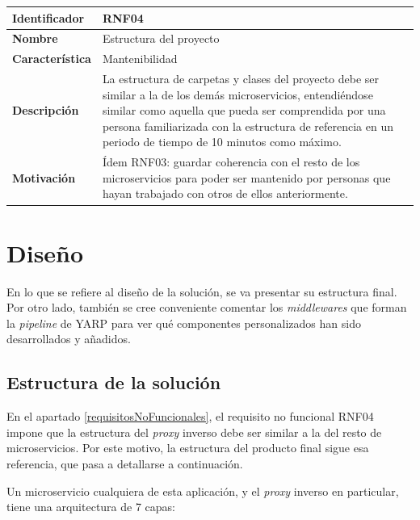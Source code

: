 \documentclass[11pt,spanish,listoffigures]{tfgetsinf}
\begin{document}
\begin{center} \begin{tabular}{| l | p{11.3cm} |}
\hline
\textbf{Identificador} & RNF04
\\ \hline
\textbf{Nombre} & Estructura del proyecto
\\ \hline
\textbf{Característica} & Mantenibilidad
\\ \hline
\textbf{Descripción} & La estructura de carpetas y clases del proyecto debe ser similar a la de los demás microservicios, entendiéndose similar como aquella que pueda ser comprendida por una persona familiarizada con la estructura de referencia en un periodo de tiempo de 10 minutos como máximo.
\\ \hline
\textbf{Motivación} & Ídem RNF03: guardar coherencia con el resto de los microservicios para poder ser mantenido por personas que hayan trabajado con otros de ellos anteriormente.
\\ \hline \end{tabular} \end{center}


	\section{Diseño}

En lo que se refiere al diseño de la solución, se va presentar su estructura final. Por otro lado, también se cree conveniente comentar los \emph{middlewares} que forman la \emph{pipeline} de YARP para ver qué componentes personalizados han sido desarrollados y añadidos.


		\subsection{Estructura de la solución}

En el apartado \ref{requisitosNoFuncionales}, el requisito no funcional RNF04 impone que la estructura del \emph{proxy} inverso debe ser similar a la del resto de microservicios. Por este motivo, la estructura del producto final sigue esa referencia, que pasa a detallarse a continuación.

Un microservicio cualquiera de esta aplicación, y el \emph{proxy} inverso en particular, tiene una arquitectura de 7 capas:
\end{document}
